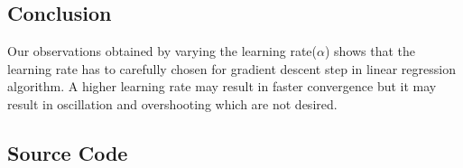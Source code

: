 \subsection{Conclusion}
Our observations obtained by varying the learning rate($\alpha$) shows that the learning rate has to carefully chosen for gradient descent step in linear regression algorithm. A higher learning rate may result in faster convergence but it may result in oscillation and overshooting which are not desired.
\subsection{Source Code}


